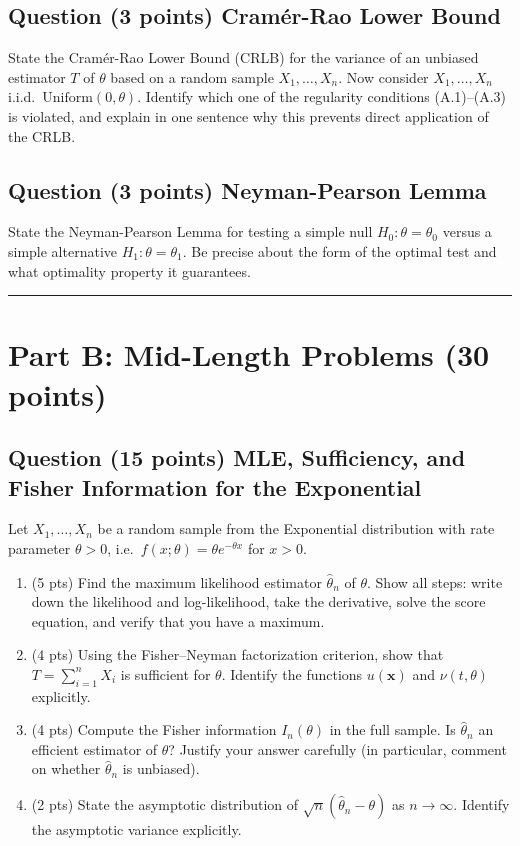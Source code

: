 \documentclass[11pt]{article}
\newcounter{qnum}
\newcommand{\question}[2]{\stepcounter{qnum}\subsection*{Question \theqnum \quad (#1 points) \hfill #2}}
\begin{document}
\question{3}{Cram\'er-Rao Lower Bound}
State the Cram\'er-Rao Lower Bound (CRLB) for the variance of an unbiased estimator $T$ of $\theta$ based on a random sample $X_1,\ldots,X_n$. Now consider $X_1,\ldots,X_n$ i.i.d.\ $\mathrm{Uniform}(0,\theta)$. Identify which one of the regularity conditions (A.1)--(A.3) is violated, and explain in one sentence why this prevents direct application of the CRLB.

\question{3}{Neyman-Pearson Lemma}
State the Neyman-Pearson Lemma for testing a simple null $H_0: \theta = \theta_0$ versus a simple alternative $H_1: \theta = \theta_1$. Be precise about the form of the optimal test and what optimality property it guarantees.

\bigskip
\hrule
\bigskip

\section*{Part B: Mid-Length Problems \hfill (30 points)}

\question{15}{MLE, Sufficiency, and Fisher Information for the Exponential}
Let $X_1,\ldots,X_n$ be a random sample from the Exponential distribution with rate parameter $\theta > 0$, i.e.\ $f(x;\theta) = \theta e^{-\theta x}$ for $x > 0$.

\begin{enumerate}[label=(\alph*),leftmargin=2em]
    \item (5 pts) Find the maximum likelihood estimator $\hat\theta_n$ of $\theta$. Show all steps: write down the likelihood and log-likelihood, take the derivative, solve the score equation, and verify that you have a maximum.
    \item (4 pts) Using the Fisher--Neyman factorization criterion, show that $T = \sum_{i=1}^n X_i$ is sufficient for $\theta$. Identify the functions $u(\mathbf{x})$ and $\nu(t,\theta)$ explicitly.
    \item (4 pts) Compute the Fisher information $I_n(\theta)$ in the full sample. Is $\hat\theta_n$ an efficient estimator of $\theta$? Justify your answer carefully (in particular, comment on whether $\hat\theta_n$ is unbiased).
    \item (2 pts) State the asymptotic distribution of $\sqrt{n}(\hat\theta_n - \theta)$ as $n \to \infty$. Identify the asymptotic variance explicitly.
\end{enumerate}
\end{document}
